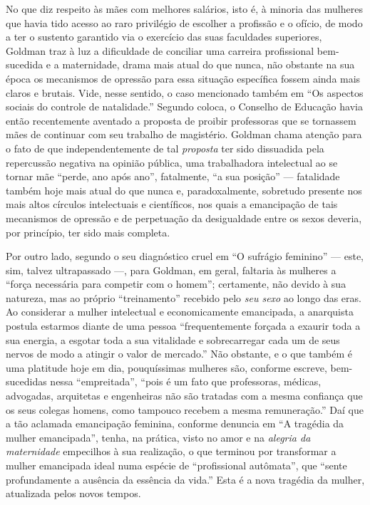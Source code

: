 No que diz respeito às mães com melhores salários, isto é, à minoria das
mulheres que havia tido acesso ao raro privilégio de escolher a
profissão e o ofício, de modo a ter o sustento garantido via o exercício
das suas faculdades superiores, Goldman traz à luz a dificuldade de
conciliar uma carreira profissional bem-sucedida e a maternidade, drama
mais atual do que nunca, não obstante na sua época os mecanismos de
opressão para essa situação específica fossem ainda mais claros e
brutais. Vide, nesse sentido, o caso mencionado também em ``Os aspectos
sociais do controle de natalidade.'' Segundo coloca, o Conselho de
Educação havia então recentemente aventado a proposta de proibir
professoras que se tornassem mães de continuar com seu trabalho de
magistério. Goldman chama atenção para o fato de que independentemente
de tal \textit{proposta} ter sido dissuadida pela repercussão negativa na
opinião pública, uma trabalhadora intelectual ao se tornar mãe ``perde,
ano após ano'', fatalmente, ``a sua posição'' --- fatalidade também hoje
mais atual do que nunca e, paradoxalmente, sobretudo presente nos mais
altos círculos intelectuais e científicos, nos quais a emancipação de
tais mecanismos de opressão e de perpetuação da desigualdade entre os
sexos deveria, por princípio, ter sido mais completa.

Por outro lado, segundo o seu diagnóstico cruel em ``O sufrágio
feminino'' --- este, sim, talvez ultrapassado ---, para Goldman, em geral,
faltaria às mulheres a ``força necessária para competir com o homem'';
certamente, não devido à sua natureza, mas ao próprio ``treinamento''
recebido pelo \textit{seu sexo} ao longo das eras. Ao considerar a mulher
intelectual e economicamente emancipada, a anarquista postula estarmos
diante de uma pessoa ``frequentemente forçada a exaurir toda a sua
energia, a esgotar toda a sua vitalidade e sobrecarregar cada um de seus
nervos de modo a atingir o valor de mercado.'' Não obstante, e o que
também é uma platitude hoje em dia, pouquíssimas mulheres são, conforme
escreve, bem-sucedidas nessa ``empreitada'', ``pois é um fato que
professoras, médicas, advogadas, arquitetas e engenheiras não são
tratadas com a mesma confiança que os seus colegas homens, como tampouco
recebem a mesma remuneração.'' Daí que a tão aclamada emancipação
feminina, conforme denuncia em ``A tragédia da mulher emancipada'',
tenha, na prática, visto no amor e na \textit{alegria da maternidade}
empecilhos à sua realização, o que terminou por transformar a mulher
emancipada ideal numa espécie de ``profissional autômata'', que ``sente
profundamente a ausência da essência da vida.'' Esta é a nova tragédia
da mulher, atualizada pelos novos tempos. 


